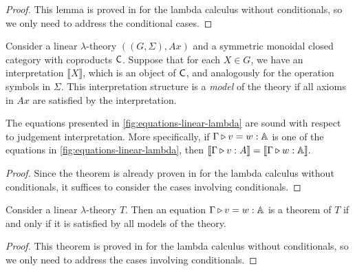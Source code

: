 \begin{proof}
  This lemma is proved in \cite[Lemma 2.2]{dahlqvist2023syntactic} for the lambda calculus without conditionals, so we only need to address the conditional cases.
\end{proof}

\begin{definition} 
Consider a linear \(\lambda\)-theory \(((G, \Sigma), Ax)\) and a symmetric monoidal closed category with coproducts \(\mathsf{C}\). 
Suppose that for each \(X \in G\), we have an interpretation \(\llbracket X \rrbracket\), which is an object of \(\mathsf{C}\), 
and analogously for the operation symbols in \(\Sigma\). 
This interpretation structure is a \emph{model} of the theory if all axioms in \(Ax\) are satisfied by the interpretation.
\end{definition}




\begin{theorem} \label{thm:soundness_classical}
The equations presented in \autoref{fig:equations-linear-lambda} are sound with respect to judgement interpretation. 
More specifically, if \(\Gamma \triangleright v = w : \mathbb{A}\) is one of the equations in \autoref{fig:equations-linear-lambda}, then 
$\llbracket \Gamma \triangleright v : A  \rrbracket = \llbracket  \Gamma \triangleright w : \mathbb{A}\rrbracket.$
\end{theorem}

\begin{proof}
  Since the theorem is already proven in \cite[Theorem 2.3]{dahlqvist2023syntactic} for the lambda calculus without conditionals, it suffices to consider the cases involving conditionals.
\end{proof}



\begin{theorem}[Completeness] \label{thm:completeness_classical}
Consider a linear $\lambda$-theory $T$. Then an equation 
$\Gamma \triangleright v = w : \mathbb{A}$
is a theorem of $T$ if and only if it is satisfied by all models of the theory.
\end{theorem}

 \begin{proof}
   This theorem is proved in \cite[Lemma 2.6]{dahlqvist2023syntactic} for the lambda calculus without conditionals, so we only need to address the cases involving conditionals.
 \end{proof}


